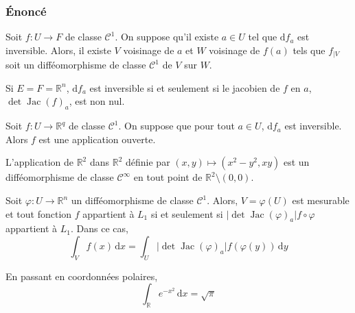 	\subsubsection{Énoncé}


	\begin{theorem}
		Soit $f : U \rightarrow F$ de classe $\mathcal{C}^1$. On suppose qu'il existe $a \in U$ tel que $\mathrm{d}f_a$ est inversible.
		\newpar
		Alors, il existe $V$ voisinage de $a$ et $W$ voisinage de $f(a)$ tels que $f_{|V}$ soit un difféomorphisme de classe $\mathcal{C}^1$ de $V$ sur $W$.
	\end{theorem}

	\begin{remark}
		Si $E = F = \mathbb{R}^n$, $\mathrm{d}f_a$ est inversible si et seulement si le jacobien de $f$ en $a$, $\det \operatorname{Jac}(f)_a$, est non nul.
	\end{remark}

	\begin{corollary}
		Soit $f : U \rightarrow \mathbb{R}^q$ de classe $\mathcal{C}^1$. On suppose que pour tout $a \in U$, $\mathrm{d}f_a$ est inversible. Alors $f$ est une application ouverte.
	\end{corollary}


	\begin{example}
		\label{214-1}
		L'application de $\mathbb{R}^2$ dans $\mathbb{R}^2$ définie par $(x, y) \mapsto (x^2-y^2, xy)$ est un difféomorphisme de classe $\mathcal{C}^\infty$ en tout point de $\mathbb{R}^2 \setminus (0,0)$.
	\end{example}


	\begin{application}
		Soit $\varphi : U \rightarrow \mathbb{R}^n$ un difféomorphisme de classe $\mathcal{C}^1$. Alors, $V = \varphi(U)$ est mesurable et tout fonction $f$ appartient à $L_1$ si et seulement si $\vert \det \operatorname{Jac}(\varphi)_a \vert f \circ \varphi$ appartient à $L_1$. Dans ce cas,
		\[ \int_V f(x) \, \mathrm{d}x = \int_U \vert \det \operatorname{Jac}(\varphi)_a \vert f (\varphi(y)) \, \mathrm{d}y \]
	\end{application}


	\begin{example}
		En passant en coordonnées polaires,
		\[ \int_{\mathbb{R}} e^{-x^2} \, \mathrm{d}x = \sqrt{\pi} \]
	\end{example}

